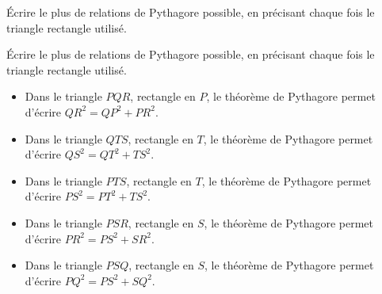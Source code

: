 \begin{exercice*}
    Écrire le plus de relations de Pythagore possible, en précisant chaque fois le triangle rectangle utilisé.
\end{exercice*}
\begin{corrige}
    Écrire le plus de relations de Pythagore possible, en précisant chaque fois le triangle rectangle utilisé.
    

    {\red
    \begin{itemize}
        \item Dans le triangle $PQR$, rectangle en $P$, le théorème de Pythagore permet d'écrire $QR^2=QP^2+PR^2$.
        \item Dans le triangle $QTS$, rectangle en $T$, le théorème de Pythagore permet d'écrire $QS^2=QT^2+TS^2$.
        \item Dans le triangle $PTS$, rectangle en $T$, le théorème de Pythagore permet d'écrire $PS^2=PT^2+TS^2$.
        \item Dans le triangle $PSR$, rectangle en $S$, le théorème de Pythagore permet d'écrire $PR^2=PS^2+SR^2$.
        \item Dans le triangle $PSQ$, rectangle en $S$, le théorème de Pythagore permet d'écrire $PQ^2=PS^2+SQ^2$.
    \end{itemize}
    }
\end{corrige}

